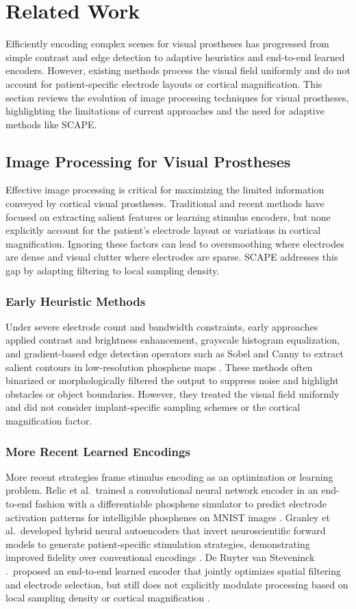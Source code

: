 \section{Related Work}
Efficiently encoding complex scenes for visual prostheses has progressed from simple contrast and edge detection to adaptive heuristics and end-to-end learned encoders. However, existing methods process the visual field uniformly and do not account for patient-specific electrode layouts or cortical magnification. This section reviews the evolution of image processing techniques for visual prostheses, highlighting the limitations of current approaches and the need for adaptive methods like SCAPE.

\subsection{Image Processing for Visual Prostheses}
Effective image processing is critical for maximizing the limited information conveyed by cortical visual prostheses. Traditional and recent methods have focused on extracting salient features or learning stimulus encoders, but none explicitly account for the patient’s electrode layout or variations in cortical magnification. Ignoring these factors can lead to oversmoothing where electrodes are dense and visual clutter where electrodes are sparse. SCAPE addresses this gap by adapting filtering to local sampling density.

\subsubsection{Early Heuristic Methods}
Under severe electrode count and bandwidth constraints, early approaches applied contrast and brightness enhancement, grayscale histogram equalization, and gradient-based edge detection operators such as Sobel and Canny to extract salient contours in low-resolution phosphene maps \cite{Liu2005,Oh2024}. These methods often binarized or morphologically filtered the output to suppress noise and highlight obstacles or object boundaries. However, they treated the visual field uniformly and did not consider implant-specific sampling schemes or the cortical magnification factor.

\subsubsection{More Recent Learned Encodings}
More recent strategies frame stimulus encoding as an optimization or learning problem. Relic et al.\ trained a convolutional neural network encoder in an end-to-end fashion with a differentiable phosphene simulator to predict electrode activation patterns for intelligible phosphenes on MNIST images \cite{Relic2022}. Granley et al.\ developed hybrid neural autoencoders that invert neuroscientific forward models to generate patient-specific stimulation strategies, demonstrating improved fidelity over conventional encodings \cite{Granley2022}. De Ruyter van Steveninck .\ proposed an end-to-end learned encoder that jointly optimizes spatial filtering and electrode selection, but still does not explicitly modulate processing based on local sampling density or cortical magnification \cite{deRuytervanSteveninck2020}.

